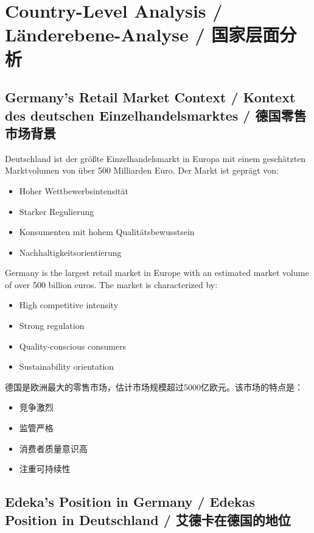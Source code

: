 \chapter{Country-Level Analysis / Länderebene-Analyse / 国家层面分析}

\section{Germany's Retail Market Context / Kontext des deutschen Einzelhandelsmarktes / 德国零售市场背景}

\begin{otherlanguage}{ngerman}
Deutschland ist der größte Einzelhandelsmarkt in Europa mit einem geschätzten Marktvolumen von über 500 Milliarden Euro. Der Markt ist geprägt von:
\begin{itemize}
    \item Hoher Wettbewerbsintensität
    \item Starker Regulierung
    \item Konsumenten mit hohem Qualitätsbewusstsein
    \item Nachhaltigkeitsorientierung
\end{itemize}
\end{otherlanguage}

Germany is the largest retail market in Europe with an estimated market volume of over 500 billion euros. The market is characterized by:
\begin{itemize}
    \item High competitive intensity
    \item Strong regulation
    \item Quality-conscious consumers
    \item Sustainability orientation
\end{itemize}

德国是欧洲最大的零售市场，估计市场规模超过5000亿欧元。该市场的特点是：
\begin{itemize}
    \item 竞争激烈
    \item 监管严格
    \item 消费者质量意识高
    \item 注重可持续性
\end{itemize}

\section{Edeka's Position in Germany / Edekas Position in Deutschland / 艾德卡在德国的地位}

